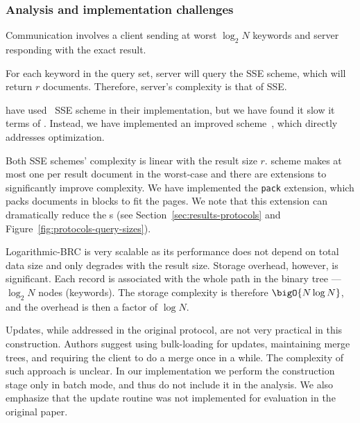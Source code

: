 	\subsubsection{Analysis and implementation challenges}

		Communication involves a client sending at worst $\log_2 N$ keywords and server responding with the exact result.

		For each keyword in the query set, server will query the SSE scheme, which will return $r$ documents.
		Therefore, server's {\IO} complexity is that of SSE\@.

		\textcite{practical-range-search} have used~\cite{cjjkrs-13} SSE scheme in their implementation, but we have found it slow it terms of {\IO}.
		Instead, we have implemented an improved scheme~\cite{cjjjkrs-14}, which directly addresses {\IO} optimization.

		Both SSE schemes' {\IO} complexity is linear with the result size $r$.
		\cite{cjjjkrs-14} scheme makes at most one {\IO} per result document in the worst-case and there are extensions to significantly improve {\IO} complexity. %
		We have implemented the \texttt{pack} extension, which packs documents in blocks to fit the {\IO} pages.
		We note that this extension can dramatically reduce the {\IO}s (see Section~\ref{sec:results-protocols} and Figure~\ref{fig:protocols-query-sizes}).

		Logarithmic\hyp{}BRC is very scalable as its performance does not depend on total data size and only degrades with the result size.
		Storage overhead, however, is significant.
		Each record is associated with the whole path in the binary tree --- $\log_2 N$ nodes (keywords).
		The storage complexity is therefore $\bigO{N \log N}$, and the overhead is then a factor of $\log N$.

		Updates, while addressed in the original protocol, are not very practical in this construction.
		Authors suggest using bulk-loading for updates, maintaining merge trees, and requiring the client to do a merge once in a while.
		The {\IO} complexity of such approach is unclear.
		In our implementation we perform the construction stage only in batch mode, and thus do not include it in the analysis.
		We also emphasize that the update routine was not implemented for evaluation in the original paper.

